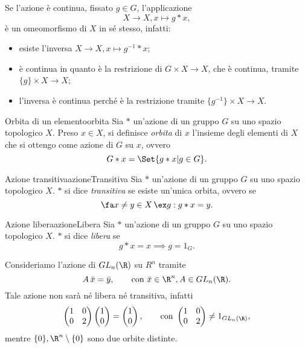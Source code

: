\begin{oss}
	Se l'azione è continua, fissato \(g\in G\), l'applicazione
	\[
		X \to X, x\mapsto g*x,
	\]
	è un omeomorfismo di \(X\) in sé stesso, infatti:
	\begin{itemize}
		\item esiste l'inversa \(X\to X,x\mapsto g^{-1}*x\);
		\item è continua in quanto è la restrizione di \(G\times X \to X\), che è continua, tramite \(\{g\}\times X \to X\);
		\item l'inversa è continua perché è la restrizione tramite \(\{g^{-1}\} \times X \to X\).
	\end{itemize}
\end{oss}

\begin{defn}{Orbita di un elemento}{orbita}
	Sia \(*\) un'azione di un gruppo \(G\) su uno spazio topologico \(X\).
	Preso \(x\in X\), si definisce \emph{orbita} di \(x\) l'insieme degli elementi di \(X\) che si ottengo come azione di \(G\) su \(x\), ovvero
	\[
		G*x = \Set{g*x | g\in G}.
	\]
\end{defn}

\begin{defn}{Azione transitiva}{azioneTransitiva}
	Sia \(*\) un'azione di un gruppo \(G\) su uno spazio topologico \(X\).
	\(*\) si dice \emph{transitiva} se esiste un'unica orbita, ovvero se
	\[
		\fa x \neq y \in X \,\ex g:g*x = y.
	\]
\end{defn}

\begin{defn}{Azione libera}{azioneLibera}
	Sia \(*\) un'azione di un gruppo \(G\) su uno spazio topologico \(X\).
	\(*\) si dice \emph{libera} se
	\[
		g*x = x \implies g = 1_G.
	\]
\end{defn}

\begin{ese}
	Consideriamo l'azione di \(GL_n(\R)\) su \(R^n\) tramite
	\[
		A\,\bar{x} = \bar{y},\qquad\text{con } \bar{x}\in\R^n,A \in GL_n(\R).
	\]
	Tale azione non sarà né libera né transitiva, infatti
	\[
		\begin{pmatrix}
			1 & 0 \\
			0 & 2
		\end{pmatrix}
		\begin{pmatrix}
			1 \\
			0
		\end{pmatrix}
		=
		\begin{pmatrix}
			1 \\
			0
		\end{pmatrix}
		,\qquad\text{con }
		\begin{pmatrix}
			1 & 0 \\
			0 & 2
		\end{pmatrix}
		\neq 1_{GL_n(\R)},
	\]
	mentre \(\{0\},\R^n\setminus \{0\}\) sono due orbite distinte.
\end{ese}

